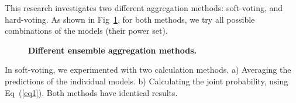 \documentclass[10pt,letterpaper]{article}
\begin{document}
\begin{table}[!ht]
\begin{adjustwidth}{-1.0in}{0in} %
  \centering
  \caption{
    {\bf The r@k metrics for the networks used to construct the  ensemble model.}}
  \label{table4}
  \end{adjustwidth}
\end{table}

This research investigates two different aggregation methods: soft-voting, and hard-voting. As shown in Fig~\ref{fig1}, for both methods, we try all possible  combinations of the models (their power set).

\begin{figure}[!h]
\caption{{\bf Different ensemble aggregation methods.}}
\label{fig1}
\end{figure}

In soft-voting, we experimented with two calculation methods. a) Averaging the predictions of the individual models. b) Calculating the joint probability, using Eq~(\ref{eq1}). Both methods have identical results.
\end{document}
